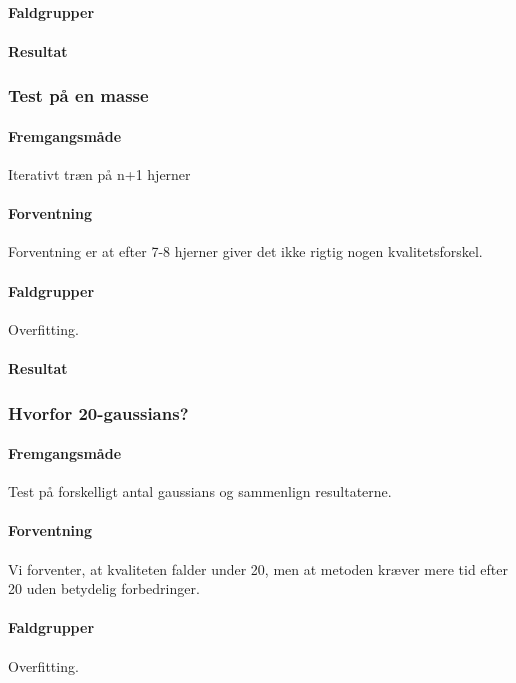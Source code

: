 \paragraph   {Faldgrupper}


\paragraph   {Resultat}

\subsubsection{Test på en masse}
\paragraph   {Fremgangsmåde}
Iterativt træn på n+1 hjerner

\paragraph   {Forventning}
Forventning er at efter 7-8 hjerner giver det ikke rigtig nogen
kvalitetsforskel.

\paragraph   {Faldgrupper}
Overfitting. 


\paragraph   {Resultat}

\subsubsection{Hvorfor 20-gaussians?}

\paragraph   {Fremgangsmåde}
Test på forskelligt antal gaussians og sammenlign resultaterne.

\paragraph   {Forventning}
Vi forventer, at kvaliteten falder under 20, men at metoden kræver mere tid
efter 20 uden betydelig forbedringer.

\paragraph   {Faldgrupper}
Overfitting. 

